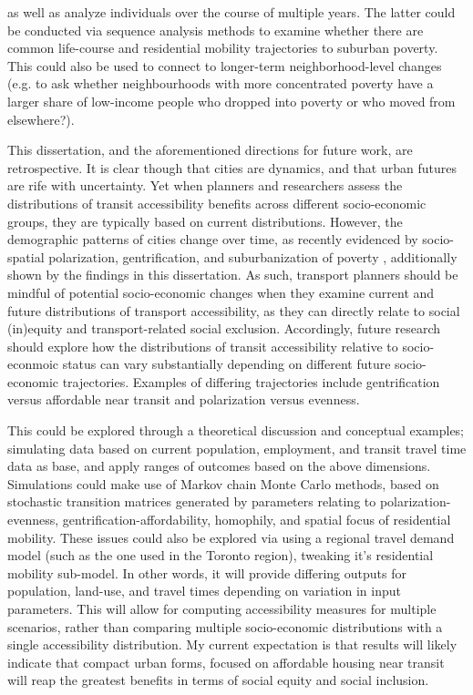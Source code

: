 as well as analyze individuals over the course of multiple years. The latter could be conducted via sequence analysis methods to examine whether there are common life-course and residential mobility trajectories to suburban poverty. This could also be used to connect to longer-term neighborhood-level changes (e.g. to ask whether neighbourhoods with more concentrated poverty have a larger share of low-income people who dropped into poverty or who moved from elsewhere?). 

This dissertation, and the aforementioned directions for future work, are retrospective. It is clear though that cities are dynamics, and that urban futures are rife with uncertainty. Yet when planners and researchers assess the distributions of transit accessibility benefits across different socio-economic groups, they are typically based on current distributions. However, the demographic patterns of cities change over time, as recently evidenced by socio-spatial polarization, gentrification, and suburbanization of poverty \cite{ades_are_2012,van_ham_understanding_2013,grant_changing_2020}, additionally shown by the findings in this dissertation. As such, transport planners should be mindful of potential socio-economic changes when they examine current and future distributions of transport accessibility, as they can directly relate to social (in)equity and transport-related social exclusion. Accordingly, future research should explore how the distributions of transit accessibility relative to socio-econmoic status can vary substantially depending on different future socio-economic trajectories. Examples of differing trajectories include gentrification versus affordable near transit and polarization versus evenness. 

This could be explored through a theoretical discussion and conceptual examples; simulating data based on current population, employment, and transit travel time data as base, and apply ranges of outcomes based on the above dimensions. Simulations could make use of Markov chain Monte Carlo methods, based on stochastic transition matrices generated by parameters relating to polarization-evenness, gentrification-affordability, homophily, and spatial focus of residential mobility. These issues could also be explored via using a regional travel demand model (such as the one used in the Toronto region), tweaking it's residential mobility sub-model.  In other words, it will provide differing outputs for population, land-use, and travel times depending on variation in input parameters. This will allow for computing accessibility measures for multiple scenarios, rather than comparing multiple socio-economic distributions with a single accessibility distribution. My current expectation is that results will likely indicate that compact urban forms, focused on affordable housing near transit will reap the greatest benefits in terms of social equity and social inclusion.


